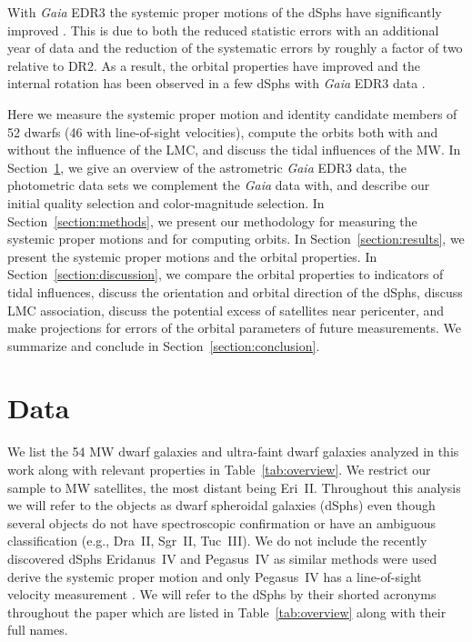 \documentclass[twocolumn]{aastex63}
\begin{document}
With {\it Gaia} EDR3 the 
systemic proper motions of the dSphs have significantly improved \citep[e.g.][]{McConnachie2020RNAAS...4..229M, Li2021ApJ...916....8L, MartinezGarcia2021MNRAS.505.5884M, Vitral2021MNRAS.504.1355V, Battaglia2022A&A...657A..54B}.
This is due to both the reduced statistic errors with an additional year of data and the reduction of the systematic errors by roughly a factor of two relative to DR2. 
As a result, the orbital properties have improved \citep{Li2021ApJ...916....8L, Battaglia2022A&A...657A..54B} and the internal rotation has been observed in a few dSphs with {\it Gaia} EDR3 data \citep{MartinezGarcia2021MNRAS.505.5884M}. 



Here we measure the systemic proper motion and identity candidate members of 52 dwarfs (46 with line-of-sight velocities),  compute the orbits both with and without the influence of the LMC, and discuss the tidal influences of the MW. 
In Section~\ref{section:data}, we give an overview of the astrometric {\it Gaia} EDR3 data, the photometric data sets we complement the {\it Gaia} data with, and describe our initial quality selection and color-magnitude selection. 
In Section~\ref{section:methods}, we present our methodology for measuring the systemic proper motions and for computing orbits.
In Section~\ref{section:results}, we present the systemic proper motions and the orbital properties.  
In Section~\ref{section:discussion}, we compare the orbital properties to indicators of tidal influences, discuss the orientation and orbital direction of the dSphs, discuss  LMC association, discuss the potential excess of satellites near pericenter, and make projections for errors of the orbital parameters of future measurements. 
We summarize and conclude in Section~\ref{section:conclusion}.



\section{Data}
\label{section:data}



We list the 54 MW dwarf galaxies and ultra-faint dwarf galaxies analyzed in this work along with  relevant properties  in Table~\ref{tab:overview}. 
We restrict our sample to MW satellites, the most distant being Eri~II. Throughout this analysis we will refer to  the objects as dwarf spheroidal galaxies (dSphs) even though several objects do not have spectroscopic confirmation or have an ambiguous classification (e.g., Dra~II,  Sgr~II, Tuc~III). 
We do not include the recently discovered dSphs Eridanus~IV and Pegasus~IV as similar methods were used derive the systemic proper motion and only Pegasus~IV has a line-of-sight velocity measurement \citep{Cerny2021ApJ...920L..44C, Cerny2022arXiv220311788C}.
We will refer to the dSphs by their shorted acronyms throughout the paper which are listed  in Table~\ref{tab:overview} along with their   full  names.
\end{document}
